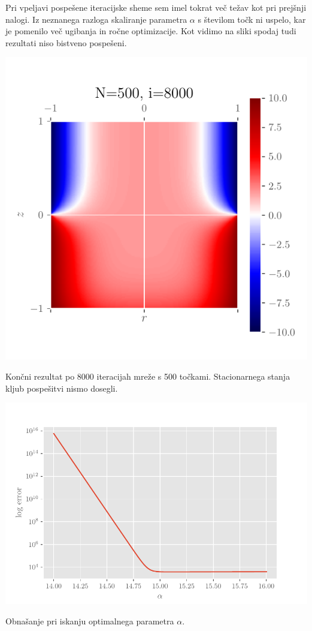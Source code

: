 Pri vpeljavi pospešene iteracijske sheme sem imel tokrat več težav kot pri prejšnji nalogi. Iz neznanega razloga skaliranje parametra $\alpha$ s številom točk ni uspelo, kar je pomenilo več ugibanja in ročne optimizacije. Kot vidimo na sliki spodaj tudi rezultati niso bistveno pospešeni.
\begin{center}
    \begin{minipage}{0.45\textwidth}
        \centering
    \includegraphics[width=\textwidth]{../old/2-valj-SOR.pdf}
    \caption{Končni rezultat po 8000 iteracijah mreže s 500 točkami. Stacionarnega stanja kljub pospešitvi nismo dosegli.}
    \end{minipage}\hfill
    \begin{minipage}{0.45\textwidth}
        \centering
        \includegraphics[width=1\textwidth]{../old/2-errors.pdf}
    \caption{Obnašanje pri iskanju optimalnega parametra $\alpha$.}
    \end{minipage}
\end{center}